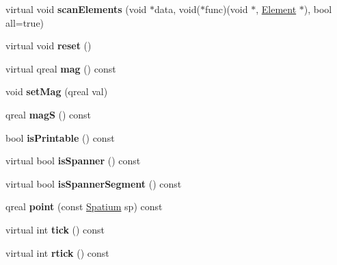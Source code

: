 \begin{DoxyCompactItemize}
\mbox{\label{class_ms_1_1_element_ab4cacda18439ce6c8c615e253c762f12}} 
virtual void {\bfseries scan\+Elements} (void $\ast$data, void($\ast$func)(void $\ast$, \hyperlink{class_ms_1_1_element}{Element} $\ast$), bool all=true)
\item 
\mbox{\label{class_ms_1_1_element_a1994a1e5042f114a6b32927b3ab0ba4c}} 
virtual void {\bfseries reset} ()
\item 
\mbox{\label{class_ms_1_1_element_ad01cda9f6017d09c9fb9305de18e9310}} 
virtual qreal {\bfseries mag} () const
\item 
\mbox{\label{class_ms_1_1_element_a49df2a43ee4c87d33b78c60cce70ff4e}} 
void {\bfseries set\+Mag} (qreal val)
\item 
\mbox{\label{class_ms_1_1_element_a7d8e2560e3ab7d216656bf79ecff7ae8}} 
qreal {\bfseries magS} () const
\item 
\mbox{\label{class_ms_1_1_element_a8612168f4af9d7a976e1f8c8f6826143}} 
bool {\bfseries is\+Printable} () const
\item 
\mbox{\label{class_ms_1_1_element_a9ee65f31082d1e62a375fdd336df6ca1}} 
virtual bool {\bfseries is\+Spanner} () const
\item 
\mbox{\label{class_ms_1_1_element_aa869afa0ddf7b15a0a0c9853cae603c4}} 
virtual bool {\bfseries is\+Spanner\+Segment} () const
\item 
\mbox{\label{class_ms_1_1_element_aa1bfaad0745fdce188743b73821e0692}} 
qreal {\bfseries point} (const \hyperlink{class_ms_1_1_spatium}{Spatium} sp) const
\item 
\mbox{\label{class_ms_1_1_element_a6c924295f18ff18e1ab0f045b0b378f8}} 
virtual int {\bfseries tick} () const
\item 
\mbox{\label{class_ms_1_1_element_af1e61456c704ff3d45407a5fa80e04ff}} 
virtual int {\bfseries rtick} () const
\item 

\end{DoxyCompactItemize}
